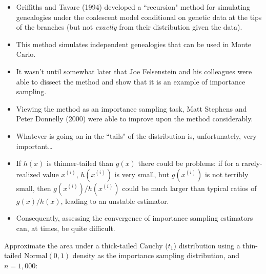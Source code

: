 \begin{itemize}
\item Griffiths and Tavare (1994) developed a ``recursion" method for simulating genealogies under the coalescent model conditional on genetic data at the tips of the branches (but not {\em exactly} from their distribution given the data).

\item This method simulates independent genealogies that can be used in Monte Carlo. 

\item It wasn't until somewhat later that Joe Felsenstein and his colleagues were able to dissect the method and show that it is an example of importance sampling. 

\item Viewing the method as an importance sampling task, Matt Stephens and Peter Donnelly (2000) were able to improve upon the method considerably.
\end{itemize}


\begin{itemize}
\item Whatever is going on in the ``tails" of the distribution is, unfortunately, very important\ldots
\item If $h(x)$ is thinner-tailed than $g(x)$ there could be problems: if for a rarely-realized value $x^{(i)}$, $h(x^{(i)})$ is very small, but $g(x^{(i)})$ is not terribly small, then $g(x^{(i)})/h(x^{(i)})$ could be much larger than typical ratios of $g(x)/h(x)$, leading to an unstable estimator.

\item Consequently, assessing the convergence of importance sampling estimators can, at times, be quite difficult.

\end{itemize}

Approximate the area under a thick-tailed Cauchy ($t_1$) distribution using a thin-tailed $\mathrm{Normal}(0,1)$ density as the importance sampling distribution, and $n=1,000$:

